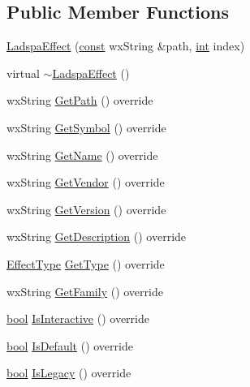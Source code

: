 \subsection*{Public Member Functions}
\begin{DoxyCompactItemize}
\item 
\hyperlink{class_ladspa_effect_a0b1cfcebcbe1c2004fa54780c6bbc6ac}{Ladspa\+Effect} (\hyperlink{getopt1_8c_a2c212835823e3c54a8ab6d95c652660e}{const} wx\+String \&path, \hyperlink{xmltok_8h_a5a0d4a5641ce434f1d23533f2b2e6653}{int} index)
\item 
virtual \hyperlink{class_ladspa_effect_afa8689239246702122bb2affb40155cc}{$\sim$\+Ladspa\+Effect} ()
\item 
wx\+String \hyperlink{class_ladspa_effect_a35e0576735c4318748ab9d7bb47c61a4}{Get\+Path} () override
\item 
wx\+String \hyperlink{class_ladspa_effect_a5f7f08d145ed3e19f32a2bba50980226}{Get\+Symbol} () override
\item 
wx\+String \hyperlink{class_ladspa_effect_aaed95498e53f9e45d3923690da7c1840}{Get\+Name} () override
\item 
wx\+String \hyperlink{class_ladspa_effect_ae34c458e9d80cadd3c1b27572eec68a2}{Get\+Vendor} () override
\item 
wx\+String \hyperlink{class_ladspa_effect_ac26d59065f2d9ecd9839ba0d5d9f100b}{Get\+Version} () override
\item 
wx\+String \hyperlink{class_ladspa_effect_a2c6a5d869140f66bd589cbc3bd8d7c67}{Get\+Description} () override
\item 
\hyperlink{_effect_interface_8h_a4809a7bb3fd1a421902a667cc1405d43}{Effect\+Type} \hyperlink{class_ladspa_effect_acfcf01d1e0080be37b77b6ae448a457e}{Get\+Type} () override
\item 
wx\+String \hyperlink{class_ladspa_effect_a211cb15740ca4ef5c458692a1f21d39f}{Get\+Family} () override
\item 
\hyperlink{mac_2config_2i386_2lib-src_2libsoxr_2soxr-config_8h_abb452686968e48b67397da5f97445f5b}{bool} \hyperlink{class_ladspa_effect_a47f7811d04a68f297a14d522dc6796da}{Is\+Interactive} () override
\item 
\hyperlink{mac_2config_2i386_2lib-src_2libsoxr_2soxr-config_8h_abb452686968e48b67397da5f97445f5b}{bool} \hyperlink{class_ladspa_effect_a8e1df84b6ddb4b69142f7101c5dd991a}{Is\+Default} () override
\item 
\hyperlink{mac_2config_2i386_2lib-src_2libsoxr_2soxr-config_8h_abb452686968e48b67397da5f97445f5b}{bool} \hyperlink{class_ladspa_effect_a967d6b8eb9e18f17c551445541157404}{Is\+Legacy} () override

\end{DoxyCompactItemize}
